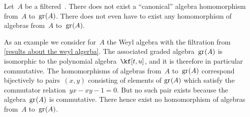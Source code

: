 \begin{warning}
	Let~$A$ be a filtered~\algebra{$\kf$}.
	There does not exist a \enquote{canonical} algebra homomorphism from~$A$ to~$\gr(A)$.
	There does not even have to exist any homomorphism of algebras from~$A$ to~$\gr(A)$.

	As an example we consider for~$A$ the Weyl algebra with the filtration from \cref{results about the weyl algerba}.
	The associated graded algebra~$\gr(A)$ is isomorphic to the polynomial algebra~$\kf[t,u]$, and it is therefore in particular commutative.
	The homomorphisms of algebras from~$A$ to~$\gr(A)$ correspond bijectively to pairs~$(x, y)$ consisting of elements of $\gr(A)$ which satisfy the commutator relation~$yx - xy - 1 = 0$.
	But no such pair exists because the algebra~$\gr(A)$ is commutative.
	There hence exist no homomorphism of algebras from~$A$ to~$\gr(A)$.
\end{warning}





